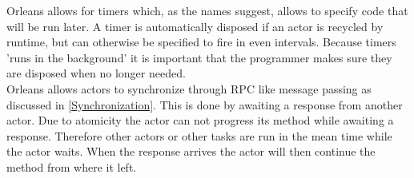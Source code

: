 Orleans allows for timers which, as the names suggest, allows to specify code that will be run later. A timer is automatically disposed if an actor is recycled by runtime, but can otherwise be specified to fire in even intervals. Because timers 'runs in the background' it is important that the programmer makes sure they are disposed when no longer needed.\\
Orleans allows actors to synchronize through RPC like message passing as discussed in \autoref{Synchronization}. This is done by awaiting a response from another actor. Due to atomicity the actor can not progress its method while awaiting a response. Therefore other actors or other tasks are run in the mean time while the actor waits. When the response arrives the actor will then continue the method from where it left.